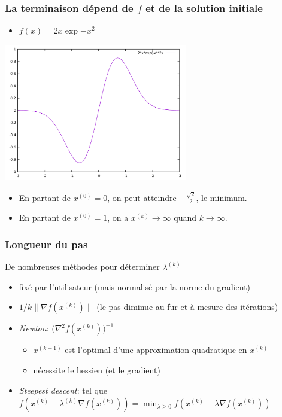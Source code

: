 \documentclass{beamer}
\begin{document}
\begin{frame}
  \frametitle{La terminaison dépend de $f$ et de la solution initiale}

  \begin{itemize}
    \item $f(x) = 2x\exp{-x^2}$
  \end{itemize}
  
  \begin{center}
      \includegraphics[width=0.6\textwidth]{desc-grad-non-conv}    
  \end{center}
  
  \begin{itemize}
  \item En partant de $x^{(0)} = 0$, on peut atteindre $-\frac{\sqrt{2}}{2}$, le minimum.
  \item En partant de $x^{(0)} = 1$, on a $x^{(k)} \rightarrow \infty$ quand $k \rightarrow \infty$. 
  \end{itemize}
  
\end{frame}


\begin{frame}
  \frametitle{Longueur du pas}

  \begin{block}{De nombreuses méthodes pour déterminer $\lambda^{(k)}$}
  \begin{itemize}
  \item fixé par l'utilisateur (mais normalisé par la norme du gradient)
  \item $1 / k \|{\nabla f}(x^{(k)})\|$ (le pas diminue au fur et à mesure des itérations)
  \item \emph{Newton}: $\Big( {\nabla^2 f}(x^{(k)}) \Big)^{-1}$
    \begin{itemize}
    \item $x^{(k+1)}$ est l'optimal d'une approximation quadratique en $x^{(k)}$
    \item nécessite le hessien (et le gradient)
    \end{itemize}
  \item \emph{Steepest descent}: tel que $f(x^{(k)} - \lambda^{(k)} {\nabla f}(x^{(k)}))
    = \min_{\lambda \geq 0} f(x^{(k)} - \lambda {\nabla f}(x^{(k)}))$
  \end{itemize}
  \end{block}
\end{frame}
\end{document}
